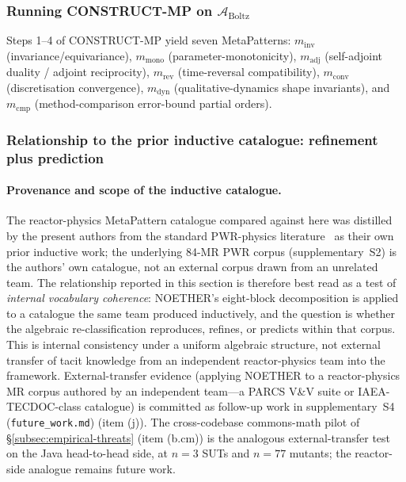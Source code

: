 \documentclass[acmsmall, screen]{acmart}
\begin{document}
\subsubsection{Running CONSTRUCT-MP on \texorpdfstring{$\mathcal{A}_{\mathrm{Boltz}}$}{A\_Boltz}}

Steps 1--4 of CONSTRUCT-MP yield seven MetaPatterns: $m_{\mathrm{inv}}$ (invariance/equivariance), $m_{\mathrm{mono}}$ (parameter-monotonicity), $m_{\mathrm{adj}}$ (self-adjoint duality / adjoint reciprocity), $m_{\mathrm{rev}}$ (time-reversal compatibility), $m_{\mathrm{conv}}$ (discretisation convergence), $m_{\mathrm{dyn}}$ (qualitative-dynamics shape invariants), and $m_{\mathrm{cmp}}$ (method-comparison error-bound partial orders).

\subsubsection{Relationship to the prior inductive catalogue: refinement plus prediction}
\label{subsec:reactor-mapping}

\paragraph{Provenance and scope of the inductive catalogue.}
The reactor-physics MetaPattern catalogue compared against here was distilled by the present authors from the standard PWR-physics literature~\cite{BellGlasstone1970, LewisMiller1993} as their own prior inductive work; the underlying 84-MR PWR corpus (supplementary~S2) is the authors' own catalogue, not an external corpus drawn from an unrelated team. The relationship reported in this section is therefore best read as a test of \emph{internal vocabulary coherence}: NOETHER's eight-block decomposition is applied to a catalogue the same team produced inductively, and the question is whether the algebraic re-classification reproduces, refines, or predicts within that corpus. This is internal consistency under a uniform algebraic structure, not external transfer of tacit knowledge from an independent reactor-physics team into the framework. External-transfer evidence (applying NOETHER to a reactor-physics MR corpus authored by an independent team---a PARCS V\&V suite or IAEA-TECDOC-class catalogue) is committed as follow-up work in supplementary~S4 (\texttt{future\_work.md}) (item (j)). The cross-codebase commons-math pilot of \S\ref{subsec:empirical-threats} (item (b.cm)) is the analogous external-transfer test on the Java head-to-head side, at $n = 3$ SUTs and $n = 77$ mutants; the reactor-side analogue remains future work.
\end{document}
